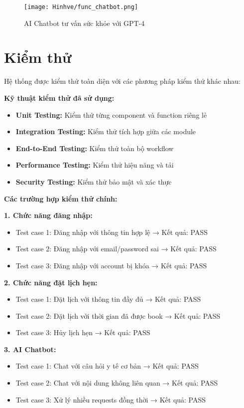 \documentclass[../DoAn.tex]{subfiles}
\begin{document}
\begin{figure}[H]
    \centering
    \texttt{[image: Hinhve/func\_chatbot.png]}
    \caption{AI Chatbot tư vấn sức khỏe với GPT-4}
    \label{fig:func_chatbot}
\end{figure}

\section{Kiểm thử}

Hệ thống được kiểm thử toàn diện với các phương pháp kiểm thử khác nhau:

\textbf{Kỹ thuật kiểm thử đã sử dụng:}
\begin{itemize}
    \item \textbf{Unit Testing:} Kiểm thử từng component và function riêng lẻ
    \item \textbf{Integration Testing:} Kiểm thử tích hợp giữa các module
    \item \textbf{End-to-End Testing:} Kiểm thử toàn bộ workflow
    \item \textbf{Performance Testing:} Kiểm thử hiệu năng và tải
    \item \textbf{Security Testing:} Kiểm thử bảo mật và xác thực
\end{itemize}

\textbf{Các trường hợp kiểm thử chính:}

\textbf{1. Chức năng đăng nhập:}
\begin{itemize}
    \item Test case 1: Đăng nhập với thông tin hợp lệ → Kết quả: PASS
    \item Test case 2: Đăng nhập với email/password sai → Kết quả: PASS
    \item Test case 3: Đăng nhập với account bị khóa → Kết quả: PASS
\end{itemize}

\textbf{2. Chức năng đặt lịch hẹn:}
\begin{itemize}
    \item Test case 1: Đặt lịch với thông tin đầy đủ → Kết quả: PASS
    \item Test case 2: Đặt lịch với thời gian đã được book → Kết quả: PASS
    \item Test case 3: Hủy lịch hẹn → Kết quả: PASS
\end{itemize}

\textbf{3. AI Chatbot:}
\begin{itemize}
    \item Test case 1: Chat với câu hỏi y tế cơ bản → Kết quả: PASS
    \item Test case 2: Chat với nội dung không liên quan → Kết quả: PASS
    \item Test case 3: Xử lý nhiều requests đồng thời → Kết quả: PASS
\end{itemize}
\end{document}

